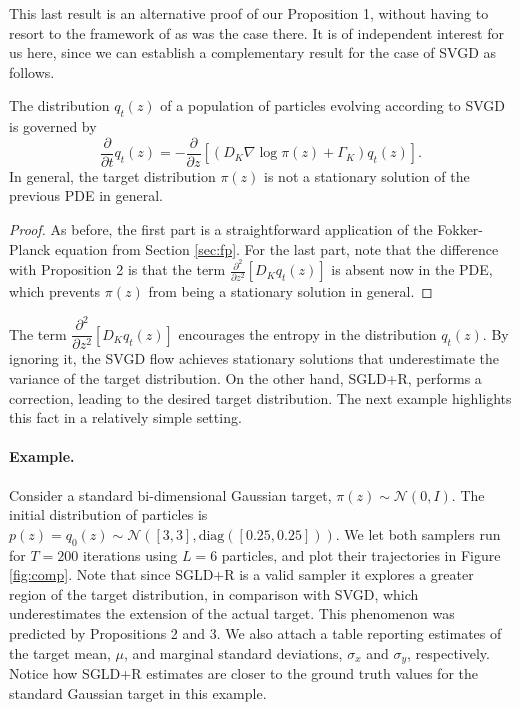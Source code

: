 This last result is an alternative proof of our Proposition 1, without having to resort to the framework of \textcite{ma2015complete} as was the case there. It is of independent interest for us here, since we can establish a complementary result for the case of SVGD as follows.
\begin{proposition}
The distribution $q_t({z})$ of a population of particles evolving according to SVGD is governed by
$$
\frac{\partial}{\partial t} q_t({z}) = -\frac{\partial}{\partial {z}} \left[ (D_K \nabla \log \pi({z}) + \Gamma_K) q_t({z})\right] .
$$
In general, the target distribution $\pi({z})$ is not a stationary solution of the previous PDE in general.
\end{proposition}
\begin{proof}
As before, the first part is a straightforward application of the Fokker-Planck equation from Section \ref{sec:fp}. For the last part, note that the difference with Proposition 2 is that the term $\frac{\partial^2}{\partial {z}^2} \left[ D_K q_t({z})  \right]$ is absent now in the PDE, which prevents $\pi({z})$ from being a stationary solution in general.
\end{proof}
\noindent The term $\dfrac{\partial^2}{\partial {z}^2} \left[ D_K q_t({z})  \right]$ encourages the entropy in the distribution $q_t({z})$. By ignoring it, the SVGD flow achieves stationary solutions that underestimate the variance of the target distribution. On the other hand, SGLD+R, performs a correction, leading to the desired target distribution. The next example highlights this fact in a relatively simple setting.

\paragraph{Example.} Consider a standard bi-dimensional Gaussian target, $\pi({z}) \sim \mathcal{N}(0, I)$. The initial distribution of particles is $p({z}) = q_0({z}) \sim \mathcal{N}([3,3], \mbox{diag}([0.25, 0.25]))$. We let both samplers run for $T = 200$ iterations using $L = 6$ particles, and plot their trajectories in Figure \ref{fig:comp}. Note that since SGLD+R is a valid sampler it explores a greater region of the target distribution, in comparison with SVGD, which underestimates the extension of the actual target. This phenomenon was predicted by Propositions 2 and 3. We also attach a table reporting estimates of the target mean, $\mu$, and marginal standard deviations, $\sigma_x$ and $\sigma_y$, respectively. Notice how SGLD+R estimates are closer to the ground truth values for the standard Gaussian target in this example.

